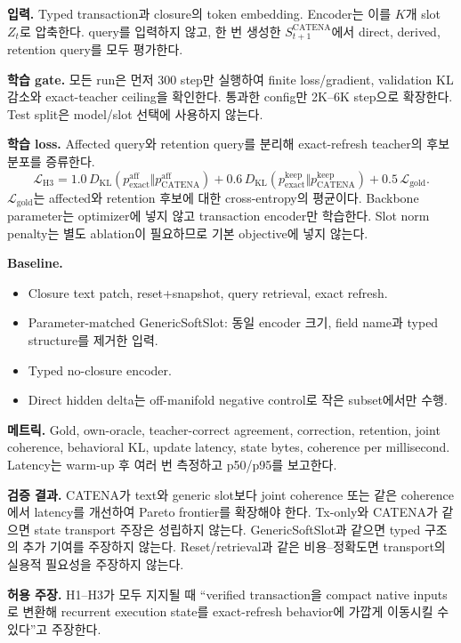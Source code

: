 \documentclass[10.5pt,a4paper]{article}
\begin{document}
\textbf{입력.} Typed transaction과 closure의 token embedding. Encoder는 이를 $K$개 slot $Z_t$로 압축한다. query를 입력하지 않고, 한 번 생성한 $S_{t+1}^{\mathrm{CATENA}}$에서 direct, derived, retention query를 모두 평가한다.

\textbf{학습 gate.} 모든 run은 먼저 300 step만 실행하여 finite loss/gradient, validation KL 감소와 exact-teacher ceiling을 확인한다. 통과한 config만 2K--6K step으로 확장한다. Test split은 model/slot 선택에 사용하지 않는다.

\textbf{학습 loss.} Affected query와 retention query를 분리해 exact-refresh teacher의 후보 분포를 증류한다.
\begin{equation}
\mathcal L_{\mathrm{H3}}
=1.0\,D_{\mathrm{KL}}(p_{\mathrm{exact}}^{\mathrm{aff}}\Vert p_{\mathrm{CATENA}}^{\mathrm{aff}})
+0.6\,D_{\mathrm{KL}}(p_{\mathrm{exact}}^{\mathrm{keep}}\Vert p_{\mathrm{CATENA}}^{\mathrm{keep}})
+0.5\,\mathcal L_{\mathrm{gold}}.
\end{equation}
$\mathcal L_{\mathrm{gold}}$는 affected와 retention 후보에 대한 cross-entropy의 평균이다. Backbone parameter는 optimizer에 넣지 않고 transaction encoder만 학습한다. Slot norm penalty는 별도 ablation이 필요하므로 기본 objective에 넣지 않는다.

\textbf{Baseline.}
\begin{itemize}
\item Closure text patch, reset+snapshot, query retrieval, exact refresh.
\item Parameter-matched GenericSoftSlot: 동일 encoder 크기, field name과 typed structure를 제거한 입력.
\item Typed no-closure encoder.
\item Direct hidden delta는 off-manifold negative control로 작은 subset에서만 수행.
\end{itemize}

\textbf{메트릭.} Gold, own-oracle, teacher-correct agreement, correction, retention, joint coherence, behavioral KL, update latency, state bytes, coherence per millisecond. Latency는 warm-up 후 여러 번 측정하고 p50/p95를 보고한다.

\textbf{검증 결과.} CATENA가 text와 generic slot보다 joint coherence 또는 같은 coherence에서 latency를 개선하여 Pareto frontier를 확장해야 한다. Tx-only와 CATENA가 같으면 state transport 주장은 성립하지 않는다. GenericSoftSlot과 같으면 typed 구조의 추가 기여를 주장하지 않는다. Reset/retrieval과 같은 비용--정확도면 transport의 실용적 필요성을 주장하지 않는다.

\textbf{허용 주장.} H1--H3가 모두 지지될 때 ``verified transaction을 compact native inputs로 변환해 recurrent execution state를 exact-refresh behavior에 가깝게 이동시킬 수 있다''고 주장한다.
\end{document}
